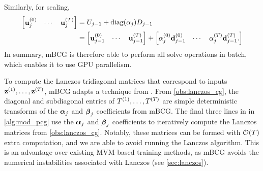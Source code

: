 %
Similarly, for scaling,
%
\begin{align*}
  \begin{bmatrix}
    \mathbf{u}_j^{(0)} & \cdots & \mathbf{u}_j^{(T)}
  \end{bmatrix}
  &=
  U_{j-1} + \text{diag}(\alpha_j) D_{j-1}
  \\
  &=
  \begin{bmatrix}
    \mathbf{u}_{j-1}^{(0)} & \cdots & \mathbf{u}_{j-1}^{(T)}
  \end{bmatrix}
  +
  \begin{bmatrix}
    \alpha_{j}^{(0)} \mathbf{d}_{j-1}^{(0)} & \cdots &  \alpha_{j}^{(T)} \mathbf{d}_{j-1}^{(T)}.
  \end{bmatrix}
\end{align*}
%
In summary, mBCG is therefore able to perform all solve operations in batch, which enables it to use GPU parallelism.

To compute the Lanczos tridiagonal matrices  that correspond to inputs $\mathbf{z}^{(1)}, \ldots, \mathbf{z}^{(T)}$, mBCG adapts a technique from \citet{saad2003iterative}.
From \cref{obs:lanczos_cg}, the diagonal and subdiagonal entries of $T^{(1)}, \ldots, T^{(T)}$ are simple deterministic transforms of the $\boldsymbol{\alpha}_j$ and $\boldsymbol{\beta}_j$ coefficients from mBCG.
The final three lines in {\color{\colornew} } in \cref{alg:mod_pcg} use the $\boldsymbol{\alpha}_j$ and $\boldsymbol{\beta}_j$ coefficients to iteratively compute the Lanczos matrices from \cref{obs:lanczos_cg}.
Notably, these matrices can be formed with $\bigo{T}$ extra computation, and we are able to avoid running the Lanczos algorithm.
This is an advantage over existing MVM-based training methods, as mBCG avoids the numerical instabilities associated with Lanczos (see \cref{sec:lanczos}).


